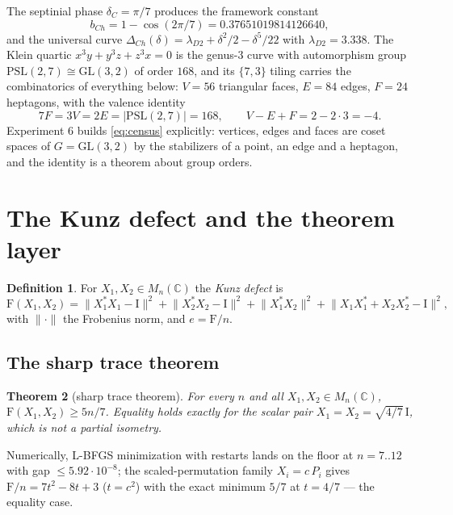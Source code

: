 \documentclass[11pt,a4paper]{article}
\newtheorem{theorem}{Theorem}
\theoremstyle{definition}
\newtheorem{definition}[theorem]{Definition}
\newcommand{\F}{\mathrm{F}}
\newcommand{\norm}[1]{\lVert #1\rVert}
\begin{document}
The septinial phase $\delta_C = \pi/7$ produces the framework constant
\[
b_{Ch} = 1-\cos(2\pi/7) = 0.37651019814126640,
\]
and the universal curve $\Delta_{Ch}(\delta) = \lambda_{D2} +
\delta^2/2 - \delta^5/22$ with $\lambda_{D2} = 3.338$. The Klein
quartic $x^3y + y^3z + z^3x = 0$ is the genus-3 curve with automorphism
group $\mathrm{PSL}(2,7) \cong \mathrm{GL}(3,2)$ of order $168$, and
its $\{7,3\}$ tiling carries the combinatorics of everything below:
$V = 56$ triangular faces, $E = 84$ edges, $F = 24$ heptagons, with the
valence identity
\begin{equation}
7F = 3V = 2E = |\mathrm{PSL}(2,7)| = 168,
\qquad V-E+F = 2-2\cdot 3 = -4.
\label{eq:census}
\end{equation}
Experiment 6 builds \eqref{eq:census} explicitly: vertices, edges and
faces are coset spaces of $G = \mathrm{GL}(3,2)$ by the stabilizers of
a point, an edge and a heptagon, and the identity is a theorem about
group orders.

\section{The Kunz defect and the theorem layer}\label{sec:theorems}

\begin{definition}
For $X_1, X_2 \in M_n(\mathbb{C})$ the \emph{Kunz defect} is
\[
\F(X_1,X_2) = \norm{X_1^*X_1-\mathrm{I}}^2 + \norm{X_2^*X_2-\mathrm{I}}^2
+ \norm{X_1^*X_2}^2 + \norm{X_1X_1^* + X_2X_2^* - \mathrm{I}}^2 ,
\]
with $\norm{\cdot}$ the Frobenius norm, and $e = \F/n$.
\end{definition}

\subsection{The sharp trace theorem}

\begin{theorem}[sharp trace theorem]\label{thm:trace}
For every $n$ and all $X_1, X_2 \in M_n(\mathbb{C})$,
$\F(X_1,X_2) \ge 5n/7$. Equality holds exactly for the scalar pair
$X_1 = X_2 = \sqrt{4/7}\,\mathrm{I}$, which is not a partial isometry.
\end{theorem}

Numerically, L-BFGS minimization with restarts lands on the floor at
$n = 7..12$ with gap $\le 5.92\cdot 10^{-8}$; the scaled-permutation
family $X_i = c\,P_i$ gives $\F/n = 7t^2 - 8t + 3$ ($t = c^2$) with the
exact minimum $5/7$ at $t = 4/7$ --- the equality case.
\end{document}
